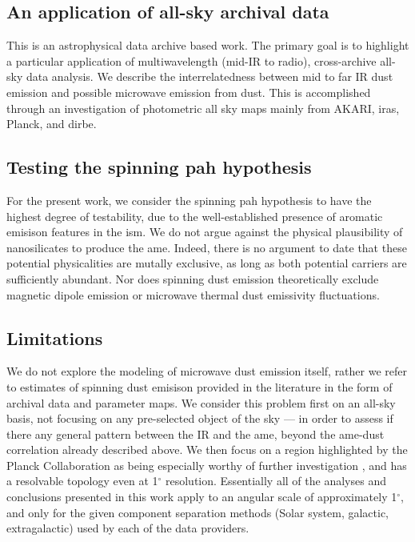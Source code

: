   \subsection{An application of all-sky archival data}
    This is an astrophysical data archive based work. The primary goal is to highlight a particular application of multiwavelength (mid-IR to radio), cross-archive all-sky data analysis. We describe the interrelatedness between mid to far IR dust emission and possible microwave emission from dust. This is accomplished through an investigation of photometric all sky maps mainly from AKARI, \gls{iras}, Planck, and \gls{dirbe}.

  \subsection{Testing the spinning \gls{pah} hypothesis}
    For the present work, we consider the spinning \gls{pah} hypothesis to have the highest degree of testability, due to the well-established presence of aromatic emisison features in the \gls{ism}.  We do not argue against the physical plausibility of nanosilicates to produce the \gls{ame}. Indeed, there is no argument to date that these potential physicalities are mutally exclusive, as long as both potential carriers are sufficiently abundant. Nor does spinning dust emission theoretically exclude magnetic dipole emission or microwave thermal dust emissivity fluctuations.

  \subsection{Limitations}
    We do not explore the modeling of microwave dust emission itself, rather we refer to estimates of spinning dust emisison provided in the literature \citep{planckXII, wmap03b} in the form of archival data and parameter maps. We consider this problem first on an all-sky basis, not focusing on any pre-selected object of the sky --- in order to assess if there any general pattern between the IR and the \gls{ame}, beyond the \gls{ame}-dust correlation already described above. We then focus on a region highlighted by the Planck Collaboration as being especially worthy of further investigation \citep{planck15X}, and has a resolvable topology even at 1$^\circ$ resolution. Essentially all of the analyses and conclusions presented in this work apply to an angular scale of approximately 1$^\circ$, and only for the given component separation methods (Solar system, galactic, extragalactic) used by each of the data providers.

